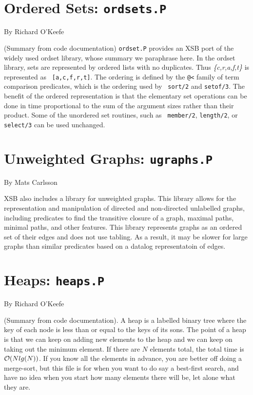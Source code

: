 \section{Ordered Sets: {\tt ordsets.P}}
By Richard O'Keefe

%
(Summary from code documentation) {\tt ordset.P} provides an XSB port
  of the widely used ordset library, whose summary we paraphrase here.
  In the ordset library, sets are represented by ordered lists with no
  duplicates.  Thus {\em \{c,r,a,f,t\}} is represented as {\tt
    [a,c,f,r,t]}.  The ordering is defined by the \verb|@<| family of
  term comparison predicates, which is the ordering used by {\tt
    sort/2} and {\tt setof/3}.  The benefit of the ordered
  representation is that the elementary set operations can be done in
  time proportional to the sum of the argument sizes rather than their
  product.  Some of the unordered set routines, such as {\tt
    member/2}, {\tt length/2}, or {\tt select/3} can be used
  unchanged.

\section{Unweighted Graphs: {\tt ugraphs.P}}

By Mats Carlsson

%
XSB also includes a library for unweighted graphs.  This library
allows for the representation and manipulation of directed and
non-directed unlabelled graphs, including predicates to find the
transitive closure of a graph, maximal paths, minimal paths, and other
features.  This library represents graphs as an ordered set of their
edges and does not use tabling.  As a result, it may be slower for
large graphs than similar predicates based on a datalog representatoin
of edges.

\section{Heaps: {\tt heaps.P}}

By Richard O'Keefe

(Summary from code documentation).  A heap is a labelled binary tree
where the key of each node is less than or equal to the keys of its
sons.  The point of a heap is that we can keep on adding new elements
to the heap and we can keep on taking out the minimum element.  If
there are $N$ elements total, the total time is ${\cal O} (Nlg(N))$.  If
you know all the elements in advance, you are better off doing a
merge-sort, but this file is for when you want to do say a best-first
search, and have no idea when you start how many elements there will
be, let alone what they are.

